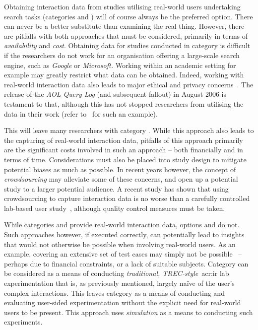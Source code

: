 Obtaining interaction data from studies utilising real-world users undertaking search tasks (categories  and ) will of course always be the preferred option. There can never be a better substitute than examining the real thing. However, there are pitfalls with both approaches that must be considered, primarily in terms of \emph{availability} and \emph{cost}. Obtaining data for studies conducted in category  is difficult if the researchers do not work for an organisation offering a large-scale search engine, such as \emph{Google} or \emph{Microsoft.} Working within an academic setting for example may greatly restrict what data can be obtained. Indeed, working with real-world interaction data also leads to major ethical and privacy concerns~\citep{korolova2009aol_query_log_privacy}. The release of the \emph{AOL Query Log} (and subsequent fallout) in August 2006 is testament to that, although this has not stopped researchers from utilising the data in their work (refer to~\cite{brenes2009aol_query_log} for such an example).

This will leave many researchers with category . While this approach also leads to the capturing of real-world interaction data, pitfalls of this approach primarily are the significant costs involved in such an approach -- both financially and in terms of time. Considerations must also be placed into study design to mitigate potential biases as much as possible. In recent years however, the concept of \emph{crowdsourcing} may alleviate some of these concerns, and open up a potential study to a larger potential audience. A recent study has shown that using crowdsourcing to capture interaction data is no worse than a carefully controlled lab-based user study~\citep{zuccon2013crowdsourcing_comparisons}, although quality control measures must be taken.

While categories  and  provide real-world interaction data, options  and  do not. Such approaches however, if executed correctly, can potentially lead to insights that would not otherwise be possible when involving real-world users. As an example, covering an extensive set of test cases may simply not be possible~\citep{keskustalo2008user_simulation} -- perhaps due to financial constraints, or a lack of suitable subjects. Category  can be considered as a means of conducting \emph{traditional, TREC-style}~\gls{acr:ir} lab experimentation that is, as previously mentioned, largely na\"{i}ve of the user's complex interactions. This leaves category  as a means of conducting and evaluating user-sided experimentation without the explicit need for real-world users to be present. This approach uses \emph{simulation} as a means to conducting such experiments.

